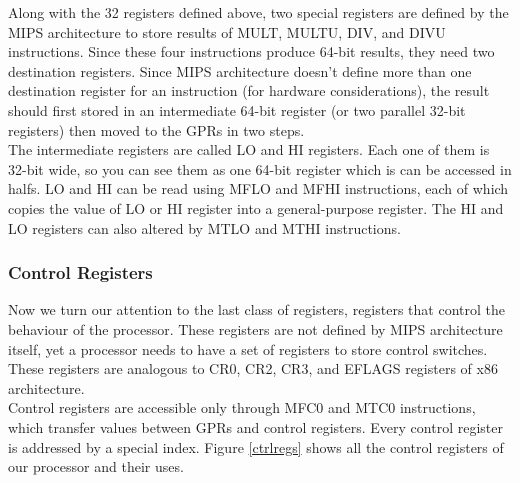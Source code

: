 \documentclass[]{scrartcl}
\begin{document}
Along with the 32 registers defined above, two special registers
are defined by the MIPS architecture to store results of MULT, MULTU,
DIV, and DIVU instructions. Since these four instructions produce
64-bit results, they need two destination registers. Since MIPS 
architecture doesn't define more than one destination register
for an instruction (for hardware considerations), the result
should first stored in an intermediate 64-bit register (or two
parallel 32-bit registers) then moved to the GPRs in two steps.\\
 
The intermediate registers are called LO and HI registers. Each
one of them is 32-bit wide, so you can see them as one 64-bit
register which is can be accessed in halfs. LO
and HI can be read using MFLO and MFHI instructions, each of which
copies the value of LO or HI register into a general-purpose register.
The HI and LO registers can also altered by MTLO and MTHI instructions.

\subsubsection{Control Registers}

Now we turn our attention to the last class of registers, registers
that control the behaviour of the processor. These registers are
not defined by MIPS architecture itself, yet a processor needs
to have a set of registers to store control switches. These
registers are analogous to CR0, CR2, CR3, and EFLAGS registers of
x86 architecture.\\

Control registers are accessible only through MFC0 and MTC0 instructions,
which transfer values between GPRs and control registers. Every control 
register is addressed by a special index. Figure \ref{ctrlregs} shows
all the control registers of our processor and their uses. \\
\end{document}
